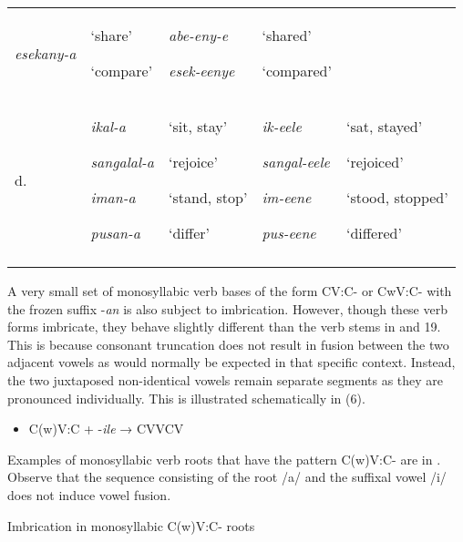 \documentclass[output=paper]{langsci/langscibook}
\begin{document}
\begin{tabularx}{\textwidth}{XXXXX}
\emph{esekany-a} & {‘share’}

‘compare’ & {\emph{abe-eny-e}}

\emph{esek-eenye} & {‘shared’}

‘compared’\\
d. & {\emph{ikal-a}}

{\emph{sangalal-a}}

{\emph{iman-a}}

\emph{pusan-a} & {‘sit, stay’}

{‘rejoice’}

{‘stand, stop’}

‘differ’ & {\emph{ik-eele}}

{\emph{sangal-eele}}

{\emph{im-eene}}

\emph{pus-eene} & {‘sat, stayed’}

{‘rejoiced’}

{‘stood, stopped’}

{‘differed’}\\
\lspbottomrule
\end{tabularx}
A very small set of monosyllabic verb bases of the form CV:C- or CwV:C- with the frozen suffix -\emph{an} is also subject to imbrication. However, though these verb forms imbricate, they behave slightly different than the verb stems in  and 19. This is because consonant truncation does not result in fusion between the two adjacent vowels as would normally be expected in that specific context. Instead, the two juxtaposed non-identical vowels remain separate segments as they are pronounced individually. This is illustrated schematically in (6). 

\begin{itemize}
\item \begin{stylelsLanginfo}
C(w)V:C + -\emph{ile}  → CVVCV
\end{stylelsLanginfo}\end{itemize}

Examples of monosyllabic verb roots that have the pattern C(w)V:C- are in . Observe that the sequence consisting of the root /a/ and the suffixal vowel /i/ does not induce vowel fusion. 

\begin{table}
\caption{Imbrication in monosyllabic C(w)V:C- roots}
\label{tab:21}
\end{table}
\end{document}
